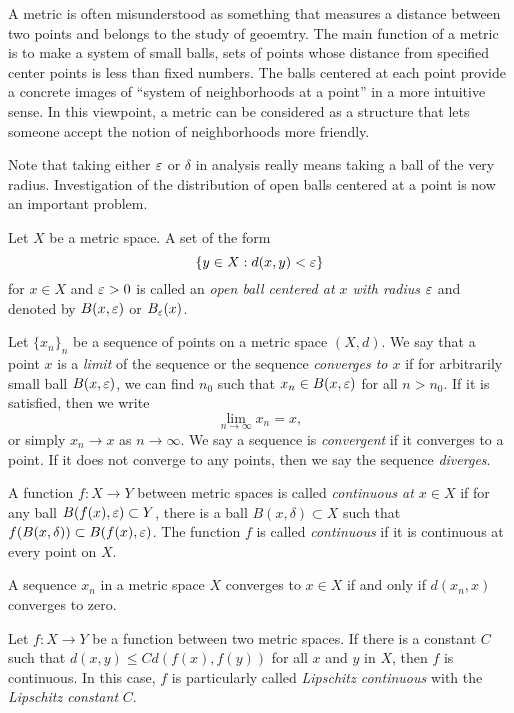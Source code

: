 \documentclass{../../large}
\begin{document}
\begin{prb}
A metric is often misunderstood as something that measures a distance between two points and belongs to the study of geoemtry.
The main function of a metric is to make a system of small balls, sets of points whose distance from specified center points is less than fixed numbers.
The balls centered at each point provide a concrete images of ``system of neighborhoods at a point'' in a more intuitive sense.
In this viewpoint, a metric can be considered as a structure that lets someone accept the notion of neighborhoods more friendly.

Note that taking either $\varepsilon$ or $\delta$ in analysis really means taking a ball of the very radius.
Investigation of the distribution of open balls centered at a point is now an important problem.

Let $X$ be a metric space.
A set of the form 
\[\{y\in X:d(x,y)<\varepsilon\}\]
for $x\in X$ and $\varepsilon>0$ is called an \emph{open ball centered at $x$ with radius $\varepsilon$} and denoted by $B(x,\varepsilon)$ or $B_\varepsilon(x)$.
\end{prb}

\begin{prb}
Let $\{x_n\}_n$ be a sequence of points on a metric space $(X,d)$.
We say that a point $x$ is a \emph{limit} of the sequence or the sequence \emph{converges to $x$} if for arbitrarily small ball $B(x,\varepsilon)$, we can find $n_0$ such that $x_n\in B(x,\varepsilon)$ for all $n>n_0$.
If it is satisfied, then we write
\[\lim_{n\to\infty}x_n=x,\]
or simply $x_n\to x$ as $n\to\infty$.
We say a sequence is \emph{convergent} if it converges to a point.
If it does not converge to any points, then we say the sequence \emph{diverges}.

A function $f:X\to Y$ between metric spaces is called \emph{continuous at $x\in X$} if for any ball $B(f(x),\varepsilon)\subset Y$, there is a ball $B(x,\delta)\subset X$ such that $f(B(x,\delta))\subset B(f(x),\varepsilon)$.
The function $f$ is called \emph{continuous} if it is continuous at every point on $X$.
\begin{parts}
\item A sequence $x_n$ in a metric space $X$ converges to $x\in X$ if and only if $d(x_n,x)$ converges to zero.
\item 
Let $f:X\to Y$ be a function between two metric spaces.
If there is a constant $C$ such that $d(x,y)\le Cd(f(x),f(y))$ for all $x$ and $y$ in $X$, then $f$ is continuous.
In this case, $f$ is particularly called \emph{Lipschitz continuous} with the \emph{Lipschitz constant} $C$.
\end{parts}
\end{prb}
\end{document}
